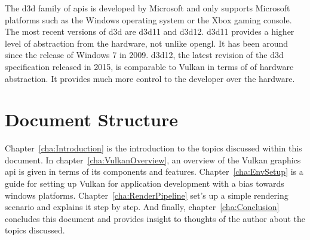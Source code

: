       The \gls{d3d} family of \glspl{api} is developed by Microsoft and only supports Microsoft platforms such as the Windows operating system or the Xbox gaming console.
      The most recent versions of \gls{d3d} are \acrlong{d3d11} and \acrlong{d3d12}.
      \acrlong{d3d11} provides a higher level of abstraction from the hardware, not unlike \gls{opengl}.
      It has been around since the release of Windows 7 in 2009.
      \acrlong{d3d12}, the latest revision of the \gls{d3d} specification released in 2015, is comparable to Vulkan in terms of of hardware abstraction.
      It provides much more control to the developer over the hardware.





  \section{Document Structure}
    Chapter~\ref{cha:Introduction} is the introduction to the topics discussed within this document.
    In chapter~\ref{cha:VulkanOverview}, an overview of the Vulkan graphics \gls{api} is given in terms of its components and features.
    Chapter~\ref{cha:EnvSetup} is a guide for setting up Vulkan for application development with a bias towards \gls{windows} platforms.
    Chapter~\ref{cha:RenderPipeline} set's up a simple rendering scenario and explains it step by step.
    And finally, chapter~\ref{cha:Conclusion} concludes this document and provides insight to thoughts of the author about the topics discussed.


